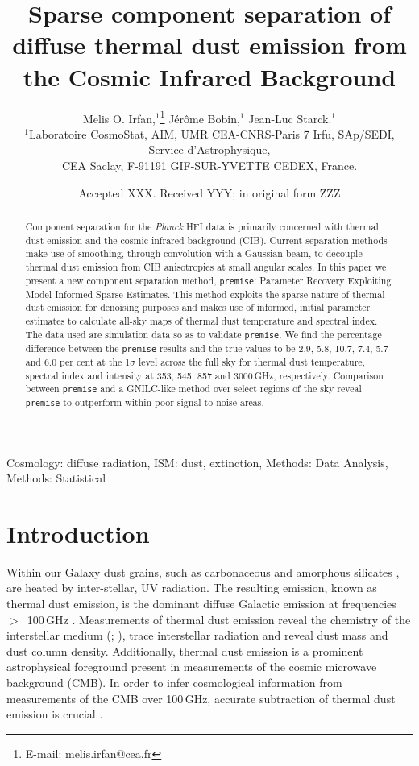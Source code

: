 \documentclass[a4paper,fleqn,usenatbib]{mnras}
\title[Sparse component separation]{Sparse component separation of diffuse thermal dust emission from the Cosmic Infrared Background}
\author[M. O. Irfan et al.]{
Melis O. Irfan,$^{1}$\thanks{E-mail: melis.irfan@cea.fr}
J\'er\^ome Bobin,$^{1}$
Jean-Luc Starck.$^{1}$
\\
$^{1}$Laboratoire CosmoStat, AIM, UMR CEA-CNRS-Paris 7 Irfu, SAp/SEDI, Service d'Astrophysique, \\ CEA Saclay, F-91191 GIF-SUR-YVETTE CEDEX, France.\\
}
\date{Accepted XXX. Received YYY; in original form ZZZ}
\begin{document}
\label{firstpage}
\pagerange{\pageref{firstpage}--\pageref{lastpage}}
\maketitle

\begin{abstract}
Component separation for the {\it{Planck}} HFI data is primarily concerned with thermal dust emission and the cosmic infrared background (CIB). Current separation methods make use of smoothing, through convolution with a Gaussian beam, to decouple thermal dust emission from CIB anisotropies at small angular scales. In this paper we present a new component separation method, {\texttt{premise}}: Parameter Recovery Exploiting Model Informed Sparse Estimates. This method exploits the sparse nature of thermal dust emission for denoising purposes and makes use of informed, initial parameter estimates to calculate all-sky maps of thermal dust temperature and spectral index. The data used are simulation data so as to validate {\texttt{premise}}. We find the percentage difference between the {\texttt{premise}} results and the true values to be 2.9, 5.8, 10.7, 7.4, 5.7 and 6.0 per cent at the 1$\sigma$ level across the full sky for thermal dust temperature, spectral index and intensity at 353, 545, 857 and 3000\,GHz, respectively. Comparison between {\texttt{premise}} and a GNILC-like method over select regions of the sky reveal {\texttt{premise}} to outperform within poor signal to noise areas. 
\end{abstract}

\begin{keywords}
Cosmology: diffuse radiation, ISM: dust, extinction, Methods: Data Analysis, Methods: Statistical
\end{keywords}



\section{Introduction}

Within our Galaxy dust grains, such as carbonaceous and amorphous silicates \citep{draine}, are heated by inter-stellar, UV radiation. The resulting emission, known as thermal dust emission, is the dominant diffuse Galactic emission at frequencies{\mbox{ $>$ 100\,GHz}} \citep{bennett}. Measurements of thermal dust emission reveal the chemistry of the interstellar medium (\citet{comp11}; \cite{jones}), trace interstellar radiation and reveal dust mass and dust column density. Additionally, thermal dust emission is a prominent astrophysical foreground present in measurements of the cosmic microwave background (CMB). In order to infer cosmological information from measurements of the CMB over 100\,GHz, accurate subtraction of thermal dust emission is crucial \citep{planckCompSep}.
\end{document}
